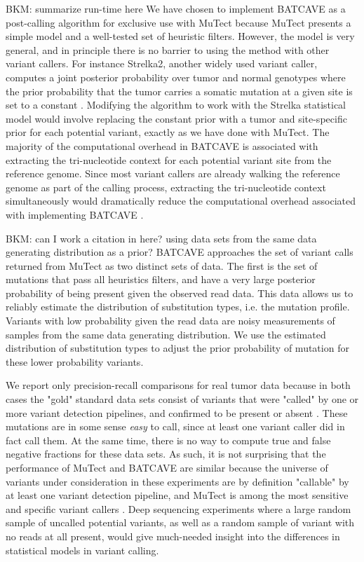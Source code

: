\documentclass[a4,center,fleqn]{NAR}
\newcommand{\bkmcomment}[1]{{\color{blue}BKM: #1}}
\newcommand{\batcave}{BATCAVE }
\begin{document}
\bkmcomment{summarize run-time here}
We have chosen to implement \batcave as a post-calling algorithm for exclusive use with MuTect because MuTect presents a simple model and a well-tested set of heuristic filters.
However, the model is very general, and in principle there is no barrier to using the method with other variant callers.
For instance Strelka2, another widely used variant caller, computes a joint posterior probability over tumor and normal genotypes where the prior probability that the tumor carries a somatic mutation at a given site is set to a constant \cite{Kim2018}.
Modifying the algorithm to work with the Strelka statistical model would involve replacing the constant prior with a tumor and site-specific prior for each potential variant, exactly as we have done with MuTect.
The majority of the computational overhead in \batcave is associated with extracting the tri-nucleotide context for each potential variant site from the reference genome.
Since most variant callers are already walking the reference genome as part of the calling process, extracting the tri-nucleotide context simultaneously would dramatically reduce the computational overhead associated with implementing \batcave.

\bkmcomment{can I work a citation in here? using data sets from the same data generating distribution as a prior?}
\batcave approaches the set of variant calls returned from MuTect as two distinct sets of data.
The first is the set of mutations that pass all heuristics filters, and  have a very large posterior probability of being present given the observed read data.
This data allows us to reliably estimate the distribution of substitution types, i.e. the mutation profile.
Variants with low probability given the read data are noisy measurements of samples from the same data generating distribution.
We use the estimated distribution of substitution types to adjust the prior probability of mutation for these lower probability variants.


We report only precision-recall comparisons for real tumor data because in both cases the "gold" standard data sets consist of variants that were "called" by one or more variant detection pipelines, and confirmed to be present or absent \cite{Griffith2015,Shi2018}.
These mutations are in some sense \textit{easy} to call, since at least one variant caller did in fact call them.
At the same time, there is no way to compute true and false negative fractions for these data sets.
As such, it is not surprising that the performance of MuTect and \batcave are similar because the universe of variants under consideration in these experiments are by definition "callable" by at least one variant detection pipeline, and MuTect is among the most sensitive and specific variant callers \cite{Griffith2015,Cibulskis2013}.
Deep sequencing experiments where a large random sample of uncalled potential variants, as well as a random sample of variant with no reads at all present, would give much-needed insight into the differences in statistical models in variant calling.
\end{document}
